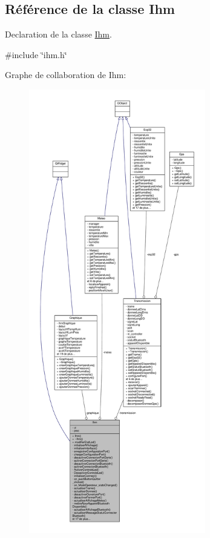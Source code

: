 \hypertarget{class_ihm}{}\subsection{Référence de la classe Ihm}
\label{class_ihm}


Declaration de la classe \hyperlink{class_ihm}{Ihm}.  




{\ttfamily \#include \char`\"{}ihm.\+h\char`\"{}}



Graphe de collaboration de Ihm\+:
\nopagebreak
\begin{figure}[H]
\begin{center}
\leavevmode
\includegraphics[height=550pt]{class_ihm__coll__graph}
\end{center}
\end{figure}

